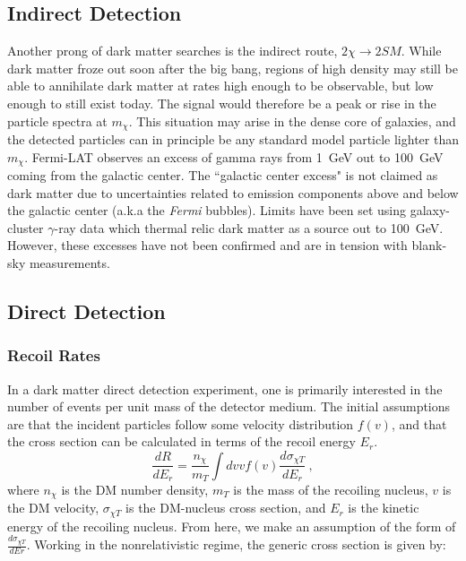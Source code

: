 \subsection{Indirect Detection}
Another prong of dark matter searches is the indirect route, $2 \chi \rightarrow 2 SM$.
While dark matter froze out soon after the big bang, regions of high density may still be able to annihilate dark matter at rates high enough to be observable, but low enough to still exist today.
The signal would therefore be a peak  or rise in the particle spectra at $m_\chi$.
This situation may arise in the dense core of galaxies, and the detected particles can in principle be any standard model particle lighter than $m_\chi$.
Fermi-LAT  \cite{collaboration_fermi_2017, hooper_dark_2011} observes an excess of gamma rays from 1~GeV out to 100~GeV coming from the galactic center.
The ``galactic center excess" is not claimed as dark matter due to uncertainties related to emission components above and below the galactic center (a.k.a the \textit{Fermi} bubbles). Limits have been set using galaxy-cluster $\gamma$-ray data which thermal relic dark matter as a source out to 100~GeV\cite{chan_ruling_2017}.
However, these excesses have not been confirmed and are in tension with blank-sky measurements\cite{dessert_dark_2020}.

\subsection{Direct Detection}
\subsubsection{Recoil Rates}
In a dark matter direct detection experiment, one is primarily interested in the number of events per unit mass of the detector medium.
 The initial assumptions are that the incident particles follow some velocity distribution $f(v)$, and that the cross section can be calculated in terms of the recoil energy $E_r$.
 \begin{equation}
     \frac{dR}{dE_r} = \frac{n_\chi}{m_T}\int dv v f(v) \frac{d \sigma_{\chi T}}{dE_r}~,
 \end{equation}
 \noindent
 where $n_\chi$ is the DM number density, $m_T$ is the mass of the recoiling nucleus, $v$ is the DM velocity, $\sigma_{\chi T}$ is the DM-nucleus cross section, and $E_r$ is the kinetic energy of the recoiling nucleus.
 From here, we make an assumption of the form of $\frac{d\sigma_{\chi T}}{dEr}$.
 Working in the nonrelativistic regime, the generic cross section is given by:
 
